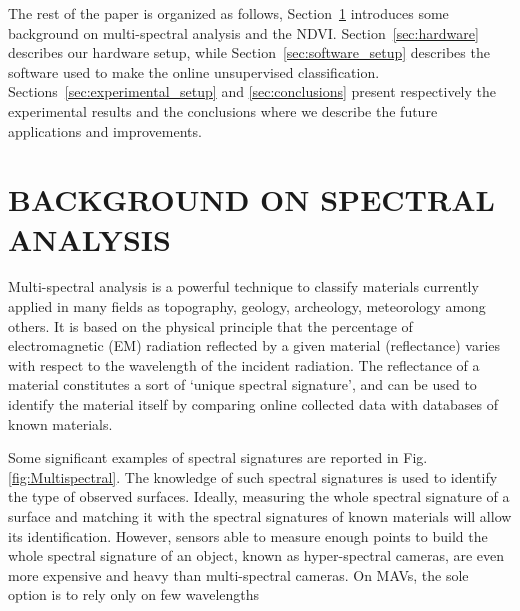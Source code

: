 \documentclass[a4paper, 10pt, conference]{ieeeconf}      %
\newcommand{\paolo}[1]{{\textcolor{red}{#1}}}
\begin{document}
The rest of the paper is organized as follows, Section~\ref{sec:background} introduces some background on multi-spectral analysis and the NDVI.
Section~\ref{sec:hardware} describes our hardware setup, while Section~\ref{sec:software_setup} describes the software used to make the online unsupervised classification. Sections~\ref{sec:experimental_setup} and \ref{sec:conclusions} present respectively the experimental results and the conclusions where we describe the future applications and improvements.




%





\section{BACKGROUND ON SPECTRAL ANALYSIS}\label{sec:background}

Multi-spectral analysis is a powerful technique to classify materials currently applied in many fields as topography, geology, archeology, meteorology among others.
It is based on  the physical principle that the percentage of electromagnetic (EM) radiation reflected by a given material (reflectance) varies with respect to the wavelength of the incident radiation.
The reflectance of a material constitutes a sort of `unique spectral signature', and can be used  to identify the material itself by comparing online collected data with databases of known materials.



Some significant examples of spectral signatures are reported in Fig. \ref{fig:Multispectral}.
The knowledge of such spectral signatures is used to identify the type of observed surfaces.
Ideally, measuring the whole spectral signature of a surface and matching it with the spectral signatures of known materials will allow its identification.
However, sensors able to measure enough points to build the whole spectral signature of an object, known as hyper-spectral cameras, are even more expensive and heavy than multi-spectral cameras.
On MAVs, the sole option is to rely only  on few wavelengths 
\end{document}
